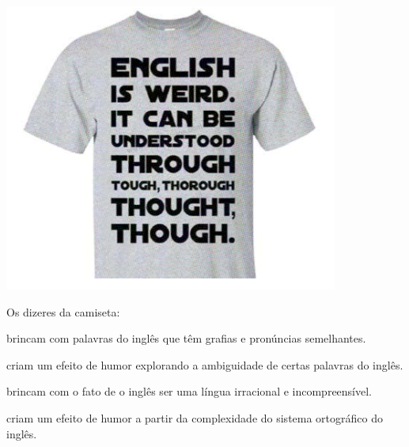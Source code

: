 
\questao
\begin{center}
\includegraphics[width=0.6\columnwidth]{subareas/linguagens/ingles-4.png}
\end{center}
Os dizeres da camiseta:
\begin{alternativas}
  \item brincam com palavras do inglês que têm grafias e pronúncias semelhantes.
  \item criam um efeito de humor explorando a ambiguidade de certas palavras do inglês.
  \item brincam com o fato de o inglês ser uma língua irracional e incompreensível.
  \item criam um efeito de humor a partir da complexidade do sistema ortográfico do inglês.
\end{alternativas}


